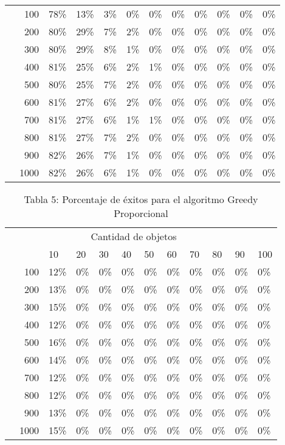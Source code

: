 \documentclass{article}
\begin{document}
\begin{center}
\begin{table}[ht]
\begin{tabularx}{0.8\textwidth}{Xr|XXXXXXXXXX}
\parbox[t]{2mm}{}&100&78\%&13\%&3\%&0\%&0\%&0\%&0\%&0\%&0\%&0\%\\
&200&80\%&29\%&7\%&2\%&0\%&0\%&0\%&0\%&0\%&0\%\\
&300&80\%&29\%&8\%&1\%&0\%&0\%&0\%&0\%&0\%&0\%\\
&400&81\%&25\%&6\%&2\%&1\%&0\%&0\%&0\%&0\%&0\%\\
&500&80\%&25\%&7\%&2\%&0\%&0\%&0\%&0\%&0\%&0\%\\
&600&81\%&27\%&6\%&2\%&0\%&0\%&0\%&0\%&0\%&0\%\\
&700&81\%&27\%&6\%&1\%&1\%&0\%&0\%&0\%&0\%&0\%\\
&800&81\%&27\%&7\%&2\%&0\%&0\%&0\%&0\%&0\%&0\%\\
&900&82\%&26\%&7\%&1\%&0\%&0\%&0\%&0\%&0\%&0\%\\
&1000&82\%&26\%&6\%&1\%&0\%&0\%&0\%&0\%&0\%&0\%\\
\end{tabularx}
\end{table}
\begin{table}[ht]
\centering
\caption*{Tabla 5: Porcentaje de éxitos para el algoritmo Greedy Proporcional}
\label{5}
\begin{tabularx}{0.8\textwidth}{Xr|XXXXXXXXXX}
&\multicolumn{10}{c}{Cantidad de objetos} \\
&&10&20&30&40&50&60&70&80&90&100\\\hline
\parbox[t]{2mm}{}&100&12\%&0\%&0\%&0\%&0\%&0\%&0\%&0\%&0\%&0\%\\
&200&13\%&0\%&0\%&0\%&0\%&0\%&0\%&0\%&0\%&0\%\\
&300&15\%&0\%&0\%&0\%&0\%&0\%&0\%&0\%&0\%&0\%\\
&400&12\%&0\%&0\%&0\%&0\%&0\%&0\%&0\%&0\%&0\%\\
&500&16\%&0\%&0\%&0\%&0\%&0\%&0\%&0\%&0\%&0\%\\
&600&14\%&0\%&0\%&0\%&0\%&0\%&0\%&0\%&0\%&0\%\\
&700&12\%&0\%&0\%&0\%&0\%&0\%&0\%&0\%&0\%&0\%\\
&800&12\%&0\%&0\%&0\%&0\%&0\%&0\%&0\%&0\%&0\%\\
&900&13\%&0\%&0\%&0\%&0\%&0\%&0\%&0\%&0\%&0\%\\
&1000&15\%&0\%&0\%&0\%&0\%&0\%&0\%&0\%&0\%&0\%\\
\end{tabularx}
\end{table}
\end{center}
\end{document}
